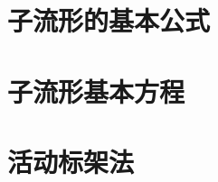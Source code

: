 \documentclass{ctexart}
\begin{document}
\section{子流形的基本公式}
	

\section{子流形基本方程}
	

\section{活动标架法}
	
\end{document}

